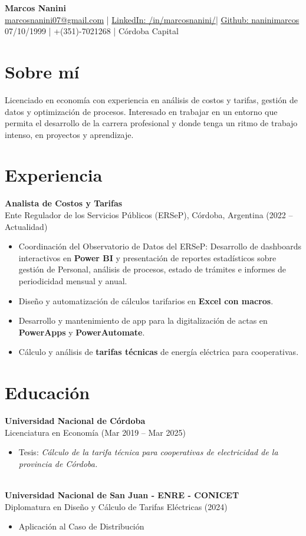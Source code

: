 \documentclass[a4paper,10pt]{article}
\begin{document}
\begin{center}
    {\LARGE \textbf{Marcos Nanini}} \\[5pt]
    \href{mailto:marcosnanini07@gmail.com}{marcosnanini07@gmail.com} \quad | \quad
    \href{https://www.linkedin.com/in/marcosnanini/}{LinkedIn: /in/marcosnanini/}\quad | \quad
    \href{https://github.com/naninimarcos/Proyectos_2024-2025}{Github: naninimarcos}
\\[5pt]
    07/10/1999 \quad | \quad +(351)-7021268 | \quad Córdoba Capital
\end{center}

\section*{Sobre mí}
Licenciado en econom\'ia con experiencia en an\'alisis de costos y tarifas, gesti\'on de datos y optimizaci\'on de procesos. Interesado en trabajar en un entorno que permita el desarrollo de la carrera profesional y donde tenga un ritmo de trabajo intenso, en proyectos y aprendizaje.
\section*{Experiencia}
\textbf{Analista de Costos y Tarifas} \\
Ente Regulador de los Servicios P\'ublicos (ERSeP), C\'ordoba, Argentina (2022 – Actualidad)
\begin{itemize}
    \item Coordinaci\'on del Observatorio de Datos del ERSeP: Desarrollo de dashboards interactivos en \textbf{Power BI} y presentaci\'on de reportes estad\'isticos sobre gesti\'on de Personal, an\'alisis de procesos, estado de tr\'amites e informes de periodicidad mensual y anual.
    \item Dise\~no y automatizaci\'on de c\'alculos tarifarios en \textbf{Excel con macros}.
    \item Desarrollo y mantenimiento de app para la digitalizaci\'on de actas en\textbf{ PowerApps} y \textbf{PowerAutomate}.
    \item C\'alculo y análisis de \textbf{tarifas t\'ecnicas} de energ\'ia el\'ectrica para cooperativas.
\end{itemize}

\section*{Educaci\'on}
\textbf{Universidad Nacional de C\'ordoba} \\
Licenciatura en Econom\'ia (Mar 2019 – Mar 2025)
\begin{itemize}
    \item Tesis: \textit{C\'alculo de la tarifa t\'ecnica para cooperativas de electricidad de la provincia de C\'ordoba.}
\end{itemize}
\\
\textbf{Universidad Nacional de San Juan - ENRE - CONICET} \\
 Diplomatura en Diseño y Cálculo de Tarifas Eléctricas (2024)
 \begin{itemize}
 \item Aplicación al Caso de Distribución 
\end{itemize}
\end{document}
